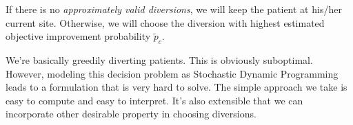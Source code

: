 If there is no \textit{approximately valid diversions}, we will
keep the patient at his/her current site. Otherwise, we will
choose the diversion with highest estimated objective improvement
probability $\tilde p_c$.

We're basically greedily diverting patients. This is obviously
suboptimal. However, modeling this decision problem as Stochastic
Dynamic Programming leads to a formulation that is very hard to
solve. The simple approach we take is easy to compute and easy
to interpret. It's also extensible that we can incorporate other
desirable property in choosing diversions.
